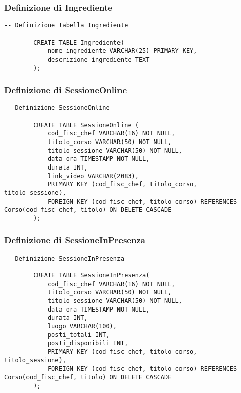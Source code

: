 \documentclass[a4paper, 12pt]{article}
\begin{document}
        \subsubsection{Definizione di Ingrediente}
        \begin{lstlisting}[style=sqlstyle]
        -- Definizione tabella Ingrediente
        
        CREATE TABLE Ingrediente(
            nome_ingrediente VARCHAR(25) PRIMARY KEY,
            descrizione_ingrediente TEXT
        );
        \end{lstlisting}
        \newpage
        \subsubsection{Definizione di SessioneOnline}
        \begin{lstlisting}[style=sqlstyle]
        -- Definizione SessioneOnline
        
        CREATE TABLE SessioneOnline (
            cod_fisc_chef VARCHAR(16) NOT NULL,
            titolo_corso VARCHAR(50) NOT NULL,
            titolo_sessione VARCHAR(50) NOT NULL,
            data_ora TIMESTAMP NOT NULL,
            durata INT,
            link_video VARCHAR(2083),
            PRIMARY KEY (cod_fisc_chef, titolo_corso, titolo_sessione),
            FOREIGN KEY (cod_fisc_chef, titolo_corso) REFERENCES Corso(cod_fisc_chef, titolo) ON DELETE CASCADE
        );
        \end{lstlisting}
        \subsubsection{Definizione di SessioneInPresenza}
        \begin{lstlisting}[style=sqlstyle]
        -- Definizione SessioneInPresenza
        
        CREATE TABLE SessioneInPresenza(
            cod_fisc_chef VARCHAR(16) NOT NULL,
            titolo_corso VARCHAR(50) NOT NULL,
            titolo_sessione VARCHAR(50) NOT NULL,
            data_ora TIMESTAMP NOT NULL,
            durata INT,
            luogo VARCHAR(100),
            posti_totali INT,
            posti_disponibili INT,
            PRIMARY KEY (cod_fisc_chef, titolo_corso, titolo_sessione),
            FOREIGN KEY (cod_fisc_chef, titolo_corso) REFERENCES Corso(cod_fisc_chef, titolo) ON DELETE CASCADE
        );
        \end{lstlisting}
\end{document}
